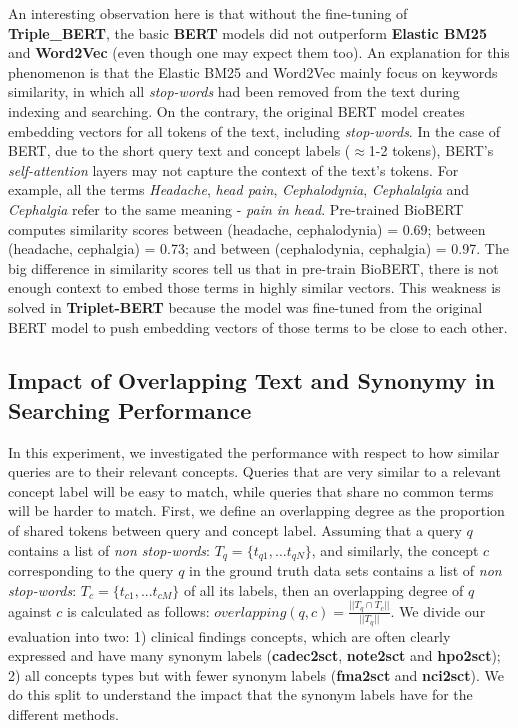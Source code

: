 \documentclass[preprint,12pt]{elsarticle}
\begin{document}
An interesting observation here is that without the fine-tuning of \textbf{Triple\_BERT}, the basic \textbf{BERT} models did not outperform \textbf{Elastic BM25} and \textbf{Word2Vec} (even though one may expect them too). An explanation for this phenomenon is that the Elastic BM25 and Word2Vec mainly focus on keywords similarity, in which all \textit{stop-words} had been removed from the text during indexing and searching. On the contrary, the original BERT model creates embedding vectors for all tokens of the text, including \textit{stop-words}. In the case of BERT, due to the short query text and concept labels ($\approx$1-2 tokens), BERT's \textit{self-attention} layers may not capture the context of the text's tokens. For example, all the terms {\textit{Headache}}, {\textit{head pain}}, {\textit{Cephalodynia}}, {\textit{Cephalalgia}} and {\textit{Cephalgia}} refer to the same meaning - {\textit{pain in head}}. Pre-trained BioBERT computes similarity scores between (headache, cephalodynia) = 0.69; between (headache, cephalgia) = 0.73; and between (cephalodynia, cephalgia) = 0.97. The big difference in similarity scores tell us that in pre-train BioBERT, there is not enough context to embed those terms in highly similar vectors. This weakness is solved in \textbf{Triplet-BERT} because the model was fine-tuned from the original BERT model to push embedding vectors of those terms to be close to each other. 


\subsection*{Impact of Overlapping Text and Synonymy in Searching Performance}
\label{sec:Overlapping}

In this experiment, we investigated the performance with respect to how similar queries are to their relevant concepts. Queries that are very similar to a relevant concept label will be easy to match, while queries that share no common terms will be harder to match. First, we define an overlapping degree as the proportion of shared tokens between query and concept label. Assuming that a query $q$ contains a list of \textit{non stop-words}: $T_q = \{t_{q1}, ... t_{qN}\}$, and similarly, the concept $c$ corresponding to the query $q$ in the ground truth data sets contains a list of \textit{non stop-words}: $T_c = \{t_{c1}, ... t_{cM}\}$ of all its labels, then an overlapping degree of $q$ against $c$ is calculated as follows:  $overlapping(q, c) = \frac{|| T_q \cap T_c  ||}{||T_q||}$. 
We divide our evaluation into two: 1) clinical findings concepts, which are often clearly expressed and have many synonym labels (\textbf{cadec2sct}, \textbf{note2sct} and \textbf{hpo2sct}); 2) all concepts types but with fewer synonym labels (\textbf{fma2sct} and \textbf{nci2sct}). We do this split to understand the impact that the synonym labels have for the different methods. 
\end{document}
